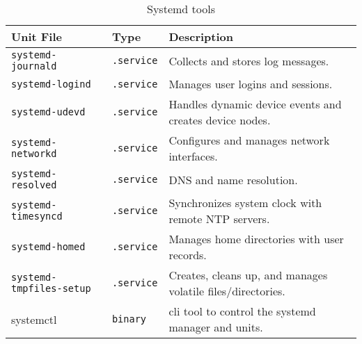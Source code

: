 \documentclass[openany, 12pt]{book}
\begin{document}
\begin{table}[ht]
  \begin{tabular}{lll}
    \toprule
    \textbf{Unit File}              & \textbf{Type}     & \textbf{Description}                                        \\
    \midrule
    \texttt{systemd-journald}       & \texttt{.service} & Collects and stores log messages.                           \\
    \texttt{systemd-logind}         & \texttt{.service} & Manages user logins and sessions.                           \\
    \texttt{systemd-udevd}          & \texttt{.service} & Handles dynamic device events and creates device nodes.     \\
    \texttt{systemd-networkd}       & \texttt{.service} & Configures and manages network interfaces.                  \\
    \texttt{systemd-resolved}       & \texttt{.service} & DNS and name resolution.                                    \\
    \texttt{systemd-timesyncd}      & \texttt{.service} & Synchronizes system clock with remote NTP servers.          \\
    \texttt{systemd-homed}          & \texttt{.service} & Manages home directories with user records.                 \\
    \texttt{systemd-tmpfiles-setup} & \texttt{.service} & Creates, cleans up, and manages volatile files/directories. \\
    systemctl                       & \texttt{binary}   & cli tool to control the systemd manager and units.          \\
    \bottomrule
  \end{tabular}
  \caption{Systemd tools}
\end{table}
\end{document}
